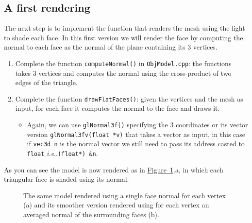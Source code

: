 \documentclass[a4paper,11pt]{article}
\makeatletter
\DeclareRobustCommand\onedot{\futurelet\@let@token\@onedot}
\def\@onedot{\ifx\@let@token.\else.\null\fi\xspace}
\def\ie{\emph{i.e}\onedot} \def\Ie{\emph{I.e}\onedot}
\newcommand{\hilight}[1]{\colorbox{bg}{#1}}
\newcommand{\coden}[1]{\texttt{#1}}
\newcommand{\code}[1]{\hilight{\texttt{#1}}}
\newcommand{\fig}[1]{\hyperref[#1]{\mbox{Figure \ref*{#1}}}\xspace}
\makeatother
\begin{document}
\subsection{A first rendering}
The next step is to implement the function that renders the mesh using the light to shade each face. In this first version we will render the face by computing the normal to each face as the normal of the plane containing its 3 vertices.

\begin{enumerate}
    \item Complete the function \code{computeNormal()} in \coden{ObjModel.cpp}: the functions takes 3 vertices and computes the normal using the cross-product of two edges of the triangle. 

    \item Complete the function \code{drawFlatFaces()}: given the vertices and the mesh as input, for each face it computes the normal to the face and draws it.
    \begin{itemize}
        \item Again, we can use \code{glNormal3f()} specifying the 3 coordinates or its vector version \code{glNormal3fv(float *v)} that takes a vector as input, in this case if \coden{vec3d n} is the normal vector we still need to pass its address casted to \coden{float}  \ie \coden{(float*) \&n}.
        \end{itemize}
\end{enumerate}

As you can see the model is now rendered as in \fig{fig:cowflatsmooth}.a, in which each triangular face is shaded using its normal.


\begin{figure}
\begin{center}
\caption{The same model rendered using a single face normal for each vertex (a) and its smoother version rendered using for each vertex an averaged normal of the surrounding faces (b).}
\label{fig:cowflatsmooth}
\end{center}
\end{figure}
\end{document}
